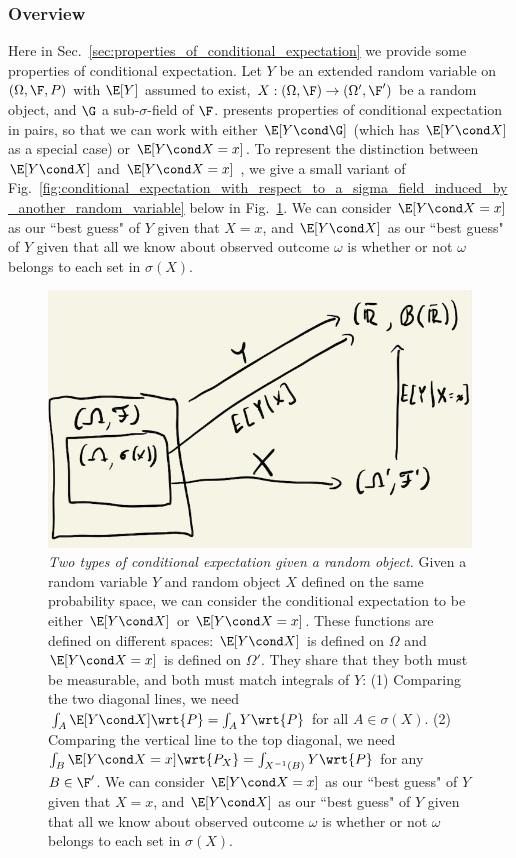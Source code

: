 \documentclass{article} %
\begin{document}
\subsubsection{Overview}

Here in Sec.~\ref{sec:properties_of_conditional_expectation} we provide some properties of conditional expectation.  Let $Y$ be an extended random variable on $(\Omega, \F, P)$  with $\E[Y]$ assumed to exist, $X : (\Omega, \F) \to  (\Omega', \F')$ be a random object, and $\G$ a sub-$\sigma$-field of $\F$.   \citet{ash2000probability} presents properties of conditional expectation in pairs, so that we can work with either $\E[Y \cond \G]$ (which has $\E[Y \cond X]$ as a special case)   or $\E[Y \cond X = x]$.  To represent the distinction between $\E[Y \cond X]$ and $\E[Y \cond X = x]$ , we give a small variant of Fig.~\ref{fig:conditional_expectation_with_respect_to_a_sigma_field_induced_by_another_random_variable} below in Fig.~\ref{fig:two_types_of_conditional_expectation_given_another_random_variable}.  We can consider $\E[Y \cond X=x]$ as our ``best guess" of $Y$ given that $X=x$, and $\E[Y \cond X]$ as our ``best guess" of $Y$ given that all we know about observed outcome $\omega$ is whether or not $\omega$ belongs to each set in $\sigma(X)$.



\begin{figure}[H]
\centering
\includegraphics[width=.6\linewidth]{images/two_types_of_conditional_expectation_given_a_random_object}
\caption{\textit{Two types of conditional expectation given a random object.}   Given a random variable $Y$ and random object $X$ defined on the same probability space, we can consider the conditional expectation to be either  $\E[Y \cond X]$ or $\E[Y \cond X=x]$.   These functions are defined on different spaces: $\E[Y \cond X]$ is defined on $\Omega$ and $\E[Y \cond X=x]$ is defined on $\Omega'$.  They share that they both must be measurable, and both must match integrals of $Y$: (1)  Comparing the two diagonal lines, we need $\int_A \E[Y \cond X] \wrt{P} = \int_A Y \wrt{P}$  for all $A \in \sigma(X)$. (2) Comparing the vertical line to the top diagonal, we need $\int_B \E[Y \cond X=x] \wrt{P_X} = \int_{X^{-1}(B)} Y \wrt{P}$ for any $B \in \F'$.  We can consider $\E[Y \cond X=x]$ as our ``best guess" of $Y$ given that $X=x$, and $\E[Y \cond X]$ as our ``best guess" of $Y$ given that all we know about observed outcome $\omega$ is whether or not $\omega$ belongs to each set in $\sigma(X)$.}
\label{fig:two_types_of_conditional_expectation_given_another_random_variable}	
\end{figure}
\end{document}

